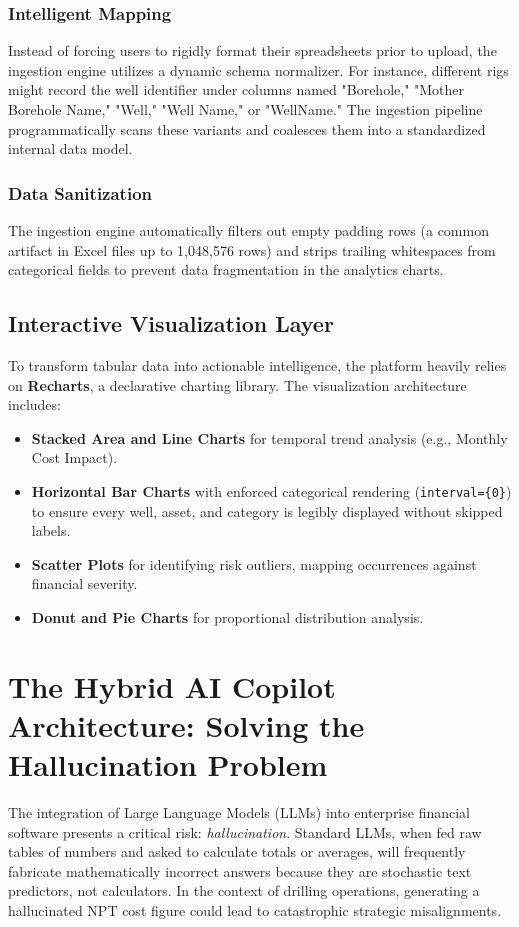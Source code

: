 \documentclass[11pt,a4paper]{article}
\begin{document}
\subsubsection{Intelligent Mapping}
Instead of forcing users to rigidly format their spreadsheets prior to upload, the ingestion engine utilizes a dynamic schema normalizer. For instance, different rigs might record the well identifier under columns named "Borehole," "Mother Borehole Name," "Well," "Well Name," or "WellName." The ingestion pipeline programmatically scans these variants and coalesces them into a standardized internal data model. 

\subsubsection{Data Sanitization}
The ingestion engine automatically filters out empty padding rows (a common artifact in Excel files up to 1,048,576 rows) and strips trailing whitespaces from categorical fields to prevent data fragmentation in the analytics charts.

\subsection{Interactive Visualization Layer}
To transform tabular data into actionable intelligence, the platform heavily relies on \textbf{Recharts}, a declarative charting library. The visualization architecture includes:
\begin{itemize}
    \item \textbf{Stacked Area and Line Charts} for temporal trend analysis (e.g., Monthly Cost Impact).
    \item \textbf{Horizontal Bar Charts} with enforced categorical rendering (\texttt{interval=\{0\}}) to ensure every well, asset, and category is legibly displayed without skipped labels.
    \item \textbf{Scatter Plots} for identifying risk outliers, mapping occurrences against financial severity.
    \item \textbf{Donut and Pie Charts} for proportional distribution analysis.
\end{itemize}

\section{The Hybrid AI Copilot Architecture: Solving the Hallucination Problem}
The integration of Large Language Models (LLMs) into enterprise financial software presents a critical risk: \textit{hallucination}. Standard LLMs, when fed raw tables of numbers and asked to calculate totals or averages, will frequently fabricate mathematically incorrect answers because they are stochastic text predictors, not calculators. In the context of drilling operations, generating a hallucinated NPT cost figure could lead to catastrophic strategic misalignments.
\end{document}
